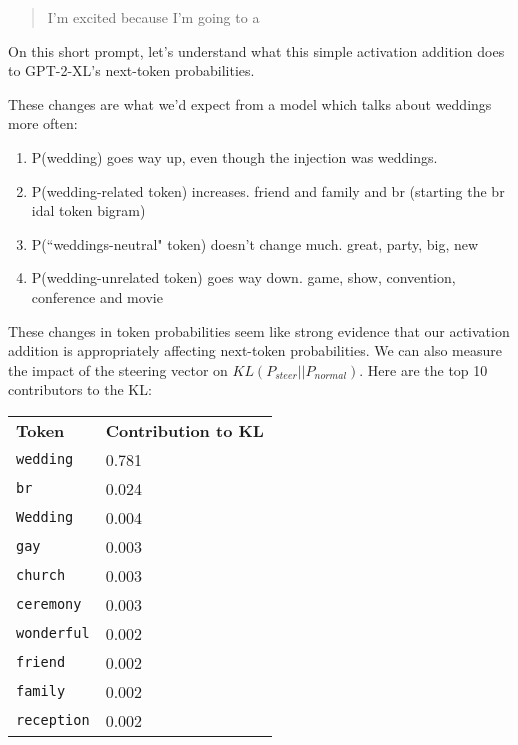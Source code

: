 \documentclass[10pt]{article}
\begin{document}
\begin{quote}
I'm excited because I'm going to a
\end{quote}

On this short prompt, let's understand what this simple activation addition does to GPT-2-XL's next-token probabilities.


These changes are what we'd expect from a model which talks about weddings more often:

\begin{enumerate}
\item P({\textvisiblespace}wedding) goes way up, even though the injection was  weddings.
\item P(wedding-related token) increases.
 friend and  family and  br (starting the  br idal token bigram)
\item P(``weddings-neutral" token) doesn't change much.
 great,  party,  big,  new
\item P(wedding-unrelated token) goes way down.
 game,  show,  convention,  conference and  movie
 \end{enumerate}
 
These changes in token probabilities seem like strong evidence that our activation addition is appropriately affecting next-token probabilities. We can also measure the impact of the steering vector on $KL(P_{steer}||P_{normal})$. Here are the top 10 contributors to the KL:


\begin{table}[h]
\centering
\begin{tabularx}{\linewidth}{XX}
	\rowcolor{gray!20} \textbf{Token}&\textbf{Contribution to KL} \\
	{\textvisiblespace}\texttt{wedding}&0.781\\
	{\textvisiblespace}\texttt{br}&0.024\\
	{\textvisiblespace}\texttt{Wedding}&0.004\\
	{\textvisiblespace}\texttt{gay}&0.003\\
	{\textvisiblespace}\texttt{church}&0.003\\
	{\textvisiblespace}\texttt{ceremony}&0.003\\
	{\textvisiblespace}\texttt{wonderful}&0.002\\
	{\textvisiblespace}\texttt{friend}&0.002\\
	{\textvisiblespace}\texttt{family}&0.002\\
	{\textvisiblespace}\texttt{reception}&0.002\\
\end{tabularx}
\end{table}
\end{document}
